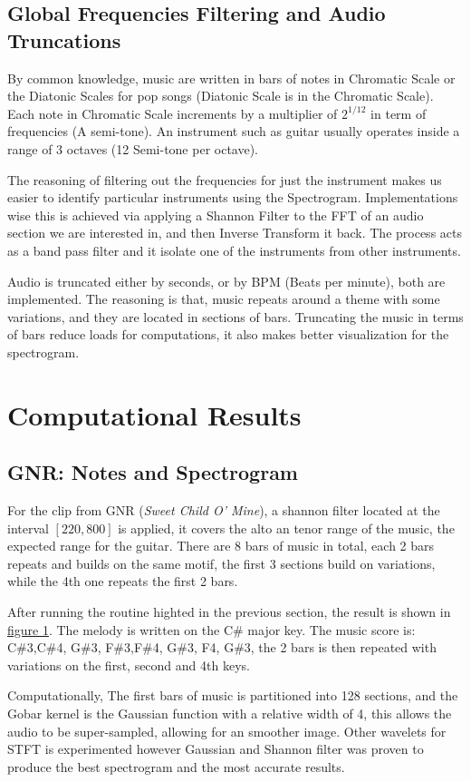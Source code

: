 \documentclass{article}
\begin{document}
    \subsection{Global Frequencies Filtering and Audio Truncations}
        \par\hspace{1.1em}
        By common knowledge, music are written in bars of notes in Chromatic Scale or the Diatonic Scales for pop songs (Diatonic Scale is in the Chromatic Scale). Each note in Chromatic Scale increments by a multiplier of $2^{1/12}$ in term of frequencies (A semi-tone). An instrument such as guitar usually operates inside a range of 3 octaves (12 Semi-tone per octave). 
        \par
        The reasoning of filtering out the frequencies for just the instrument makes us easier to identify particular instruments using the Spectrogram. Implementations wise this is achieved via applying a Shannon Filter to the FFT of an audio section we are interested in, and then Inverse Transform it back. The process acts as a band pass filter and it isolate one of the instruments from other instruments. 
        \par
        Audio is truncated either by seconds, or by BPM (Beats per minute), both are implemented. The reasoning is that, music repeats around a theme with some variations, and they are located in sections of bars. Truncating the music in terms of bars reduce loads for computations, it also makes better visualization for the spectrogram. 

\section{Computational Results}
    \subsection{GNR: Notes and Spectrogram}
        \par\hspace{1.1em}
        For the clip from GNR (\textit{Sweet Child O' Mine}), a shannon filter located at the interval $[220, 800]$ is applied, it covers the alto an tenor range of the music, the expected range for the guitar.
        There are 8 bars of music in total, each 2 bars repeats and builds on the same motif, the first 3 sections build on variations, while the 4th one repeats the first 2 bars. 
        \par
        After running the routine highted in the previous section, the result is shown in \hyperref[fig:1]{figure 1}. The melody is written on the C\# major key. The music score is: C\#3,C\#4, G\#3, F\#3,F\#4, G\#3, F4, G\#3, the 2 bars is then repeated with variations on the first, second and 4th keys.   
        \par
        Computationally, The first bars of music is partitioned into 128 sections, and the Gobar kernel is the Gaussian function with a relative width of 4, this allows the audio to be super-sampled, allowing for an smoother image. Other wavelets for STFT is experimented however Gaussian and Shannon filter was proven to produce the best spectrogram and the most accurate results. 
\end{document}
